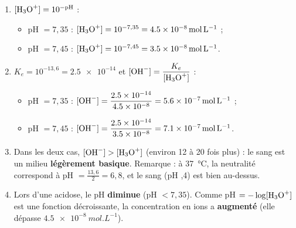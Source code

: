 \documentclass[11pt]{article}
\begin{document}
\begin{corrige}
\begin{enumerate}
    \item $[\ce{H3O+}] = 10^{-\text{pH}}$ :
    \begin{itemize}
        \item pH $= 7{,}35$ : $[\ce{H3O+}] = 10^{-7,35} = \SI{4,5e-8}{mol.L^{-1}}$ ;
        \item pH $= 7{,}45$ : $[\ce{H3O+}] = 10^{-7,45} = \SI{3,5e-8}{mol.L^{-1}}$.
    \end{itemize}
    \item $K_e = 10^{-13,6} = \num{2,5e-14}$ et $[\ce{OH-}] = \dfrac{K_e}{[\ce{H3O+}]}$ :
    \begin{itemize}
        \item pH $= 7{,}35$ : $[\ce{OH-}] = \dfrac{\num{2,5e-14}}{\num{4,5e-8}} = \SI{5,6e-7}{mol.L^{-1}}$ ;
        \item pH $= 7{,}45$ : $[\ce{OH-}] = \dfrac{\num{2,5e-14}}{\num{3,5e-8}} = \SI{7,1e-7}{mol.L^{-1}}$.
    \end{itemize}
    \item Dans les deux cas, $[\ce{OH-}] > [\ce{H3O+}]$ (environ 12 à 20 fois plus) : le sang est un milieu \textbf{légèrement basique}. Remarque : à \SI{37}{\celsius}, la neutralité correspond à pH $= \frac{13{,}6}{2} = 6{,}8$, et le sang (pH ,4) est bien au-dessus.
    \item Lors d'une acidose, le pH \textbf{diminue} (pH $< 7{,}35$). Comme pH $= -\log[\ce{H3O+}]$ est une fonction décroissante, la concentration en ions  a \textbf{augmenté} (elle dépasse $\SI{4,5e-8}{mol.L^{-1}}$).
\end{enumerate}
\end{corrige}
\end{document}
